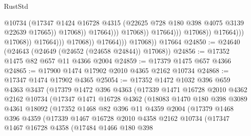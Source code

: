 \begin{lexlean}{RustStd}
\begin{coremodule}
                                                          @10734
                                                          (@17347
                                                            @1424
                                                            @16728
                                                            @4315
                                                            (@22625
                                                              @728
                                                              @180
                                                              @398
                                                              @4075
                                                              @3139
                                                              @22639
                                                              @17665))
                                                          @17068))
                                                      @17664)))
                                                @17068))
                                            @17664)))
                                      @17068))
                                  @17664)))
                            @17068))
                        @17664)))
                  @17068))
              @17664)))
        @17068))
    @17664
@24850 := @24640 (@24643 (@24649 (@24652 (@24658 @24844)) @17068))
@24856 := @17352 @1475 @82 @657 @11 @4366 @2004
@24859 := @17379 @1475 @657 @4366
@24865 := @17900 @1474 @17902 @2010 @4365 @2162 @10734
@24868 := @17347 @1474 @17902 @4365
@25054 := @17352
    @1472
    @1032
    @396
    @659
    @4363
    @3437
    (@17379
      @1472
      @396
      @4363
      (@17339
        @1471
        @16728
        @2010
        @4362
        @2162
        @10734
        (@17347
          @1471
          @16728
          @4362
          (@18083
            @1470
            @180
            @398
            @3089
            @4361
            @18092
            (@17352
              @1468
              @82
              @396
              @11
              @4359
              @2004
              (@17379
                @1468
                @396
                @4359
                (@17339
                  @1467
                  @16728
                  @2010
                  @4358
                  @2162
                  @10734
                  (@17347
                    @1467
                    @16728
                    @4358
                    (@17484
                      @1466
                      @180
                      @398

\end{coremodule}
\end{lexlean}
